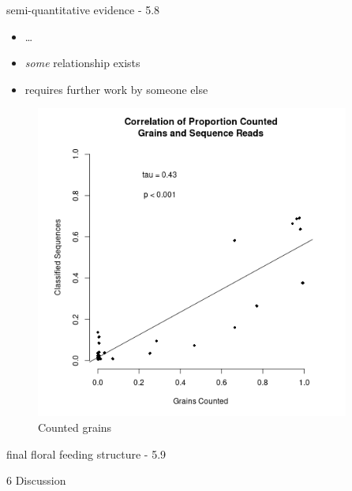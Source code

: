 \documentclass[
  ignorenonframetext,
]{beamer}
\providecommand{\tightlist}{%
  \setlength{\itemsep}{0pt}\setlength{\parskip}{0pt}}
\begin{document}
\begin{frame}{semi-quantitative evidence - 5.8}
\protect\hypertarget{semi-quantitative-evidence---5.8}{}
\begin{itemize}
\tightlist
\item
  \ldots{}
\item
  \emph{some} relationship exists
\item
  requires further work by someone else
\end{itemize}

\begin{figure}
\centering
\includegraphics[width=0.92\textwidth,height=\textheight]{../graphics/plots/CorrelationCountedSequences.png}
\caption{Counted grains}
\end{figure}

\end{frame}

\begin{frame}{final floral feeding structure - 5.9}
\protect\hypertarget{final-floral-feeding-structure---5.9}{}
\end{frame}

\begin{frame}{6 \textbar{} Discussion}
\protect\hypertarget{discussion}{}
\end{frame}
\end{document}
